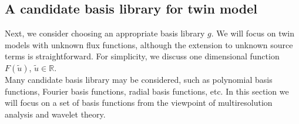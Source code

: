 \documentclass[a4paper,onecolumn]{article}
\theoremstyle{remark}
\begin{document}
\subsection{A candidate basis library for twin model}
\label{basis selection}
\noindent Next, we consider choosing an appropriate basis library $g$.
We will focus on twin models with unknown flux functions, although
the extension to unknown source terms is straightforward.
For simplicity, we discuss one dimensional function $F(\tilde{u})$, $\tilde{u}\in \mathbb{R}$.
\\

\noindent Many candidate basis library may be considered, such as polynomial basis functions,
Fourier basis functions, radial basis functions, etc.
In this section we will focus on a set of basis functions
from the viewpoint of multiresolution analysis and wavelet theory.
\\
\end{document}
